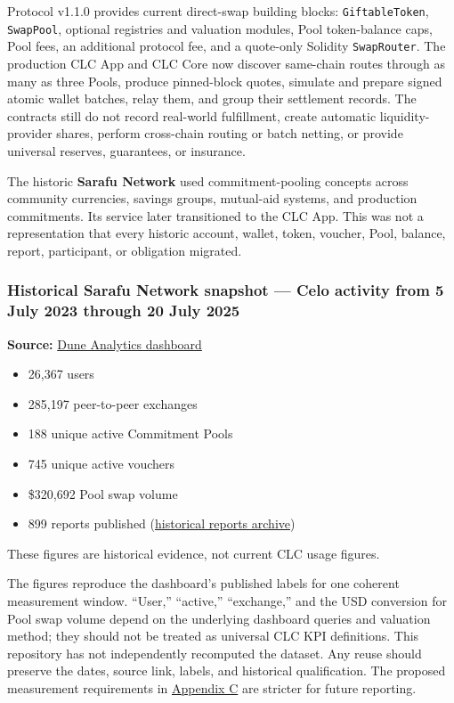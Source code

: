 \documentclass[11pt]{article}
\begin{document}
Protocol v1.1.0 provides current direct-swap building blocks: \texttt{GiftableToken}, \texttt{SwapPool}, optional registries and valuation modules, Pool token-balance caps, Pool fees, an additional protocol fee, and a quote-only Solidity \texttt{SwapRouter}. The production CLC App and CLC Core now discover same-chain routes through as many as three Pools, produce pinned-block quotes, simulate and prepare signed atomic wallet batches, relay them, and group their settlement records. The contracts still do not record real-world fulfillment, create automatic liquidity-provider shares, perform cross-chain routing or batch netting, or provide universal reserves, guarantees, or insurance.

The historic \textbf{Sarafu Network} used commitment-pooling concepts across community currencies, savings groups, mutual-aid systems, and production commitments. Its service later transitioned to the CLC App. This was not a representation that every historic account, wallet, token, voucher, Pool, balance, report, participant, or obligation migrated.

\subsubsection*{Historical Sarafu Network snapshot --- Celo activity from 5 July 2023 through 20 July 2025}

\textbf{Source:} \href{https://dune.com/grassrootseconomics/sarafu-network}{Dune Analytics dashboard}

\begin{itemize}[leftmargin=*]
\item 26,367 users
\item 285,197 peer-to-peer exchanges
\item 188 unique active Commitment Pools
\item 745 unique active vouchers
\item \$320,692 Pool swap volume
\item 899 reports published (\href{https://sarafu.network/reports}{historical reports archive})
\end{itemize}
These figures are historical evidence, not current CLC usage figures.

The figures reproduce the dashboard's published labels for one coherent measurement window. ``User,'' ``active,'' ``exchange,'' and the USD conversion for Pool swap volume depend on the underlying dashboard queries and valuation method; they should not be treated as universal CLC KPI definitions. This repository has not independently recomputed the dataset. Any reuse should preserve the dates, source link, labels, and historical qualification. The proposed measurement requirements in \href{https://docs.cosmolocal.credit/white-paper/appendix-c-kpi-definitions}{Appendix C} are stricter for future reporting.
\end{document}
